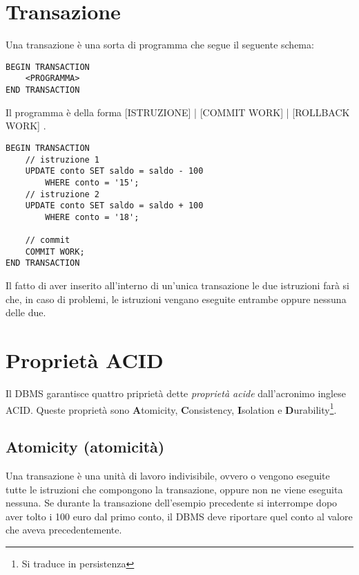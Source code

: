 \documentclass[11pt]{report}
\begin{document}

\section{Transazione}


Una transazione \`e una sorta di programma che segue il seguente schema:
\begin{lstlisting}
BEGIN TRANSACTION
	<PROGRAMMA>
END TRANSACTION
\end{lstlisting}
Il programma \`e della forma { [ISTRUZIONE] | [COMMIT WORK] | [ROLLBACK WORK] }.
\newpage
{}
\begin{lstlisting}
BEGIN TRANSACTION
	// istruzione 1
	UPDATE conto SET saldo = saldo - 100
		WHERE conto = '15';
	// istruzione 2
	UPDATE conto SET saldo = saldo + 100
		WHERE conto = '18';
	
	// commit
	COMMIT WORK;
END TRANSACTION
\end{lstlisting}
Il fatto di aver inserito all'interno di un'unica transazione le due istruzioni far\`a si che, in caso di problemi, le istruzioni vengano eseguite entrambe oppure nessuna delle due.

\section{Propriet\`a ACID}

Il DBMS garantisce quattro pripriet\`a dette \emph{propriet\`a acide} dall'acronimo inglese ACID. Queste propriet\`a sono \textbf{A}tomicity, \textbf{C}onsistency, \textbf{I}solation e \textbf{D}urability\footnote{Si traduce in persistenza}.

\subsection{Atomicity (atomicit\`a)}

Una transazione \`e una unit\`a di lavoro indivisibile, ovvero o vengono eseguite tutte le istruzioni che compongono la transazione, oppure non ne viene eseguita nessuna. Se durante la transazione dell'esempio precedente si interrompe dopo aver tolto i 100 euro dal primo conto, il DBMS deve riportare quel conto al valore che aveva precedentemente.
\end{document}
